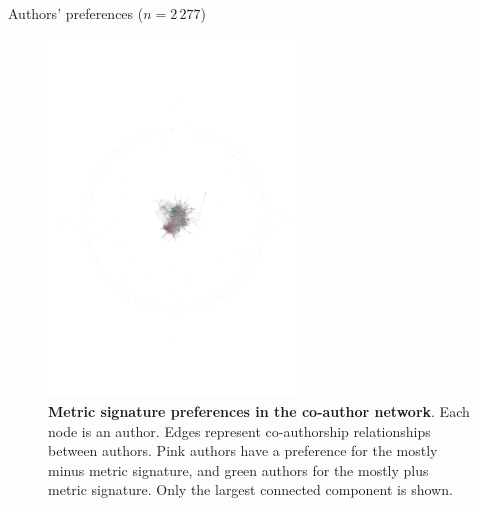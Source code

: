 \documentclass[10pt]{beamer}
\begin{document}
\begin{frame}{Authors' preferences ($n=2\,277$)}
    \vspace{-0.75em}
    \begin{figure}[!h]
    \centering
    \includegraphics[width=0.6\textwidth,trim=250 350 225 350,clip]{authors_network.pdf}
    
    \caption{\textbf{Metric signature preferences in the co-author network}. Each node is an author. Edges represent co-authorship relationships between authors. Pink authors have a preference for the mostly minus metric signature, and green authors for the mostly plus metric signature. Only the largest connected component is shown. %
    }
    \label{fig:co-author-network}
\end{figure}
\end{frame}
\end{document}
